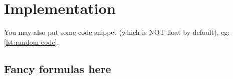 \chapter{Implementation}
\label{chap:implementation}

You may also put some code snippet (which is NOT float by default), eg: \cref{lst:random-code}.



\section{Fancy formulas here}